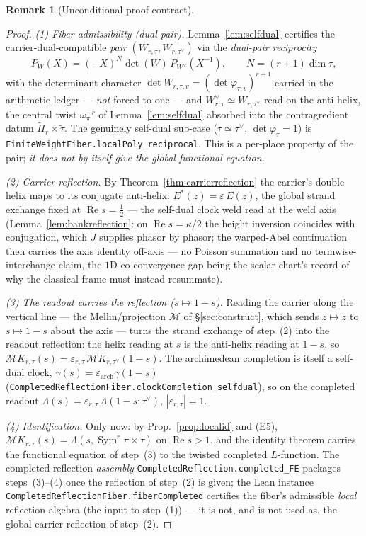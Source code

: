 \documentclass[11pt]{article}
\theoremstyle{definition}
\newtheorem{remark}[theorem]{Remark}
\renewcommand{\Re}{\operatorname{Re}}
\newcommand{\Sym}{\operatorname{Sym}}
\begin{document}
\begin{remark}[Unconditional proof contract]
\begin{enumerate}
\begin{proof}
\emph{(1) Fiber admissibility (dual pair).} Lemma~\ref{lem:selfdual} certifies the carrier-dual-compatible
\emph{pair} $(W_{r,\tau},W_{r,\tau^\vee})$ via the \emph{dual-pair reciprocity}
\[
  P_{W}(X)=(-X)^{N}\det(W)\,P_{W^\vee}(X^{-1}),\qquad N=(r+1)\dim\tau,
\]
with the determinant character $\det W_{r,\tau,v}=(\det\varphi_{\tau,v})^{r+1}$ carried in the arithmetic
ledger --- \emph{not} forced to one --- and $W_{r,\tau}^\vee\simeq W_{r,\tau^\vee}$ read on the anti-helix, the central twist $\omega_\pi^{-r}$ of Lemma~\ref{lem:selfdual} absorbed into the contragredient datum $\widetilde\Pi_r\times\widetilde\tau$.
The genuinely self-dual sub-case ($\tau\simeq\tau^\vee$, $\det\varphi_\tau=1$) is
\texttt{FiniteWeightFiber.localPoly\_reciprocal}. This is a per-place property of the pair; \emph{it does not by
itself give the global functional equation.}

\emph{(2) Carrier reflection.} By Theorem~\ref{thm:carrierreflection} the carrier's double helix maps to its
conjugate anti-helix: $E^{*}(\bar z)=\varepsilon\,E(z)$, the global strand exchange fixed at $\Re s=\tfrac12$
--- the self-dual clock weld read at the weld axis (Lemma~\ref{lem:bankreflection}: on $\Re s=\kappa/2$ the height inversion coincides with conjugation, which $J$ supplies phasor by phasor; the warped-Abel continuation then carries the axis identity off-axis --- no Poisson summation and no termwise-interchange claim, the $1$D co-convergence gap being the scalar chart's record of why the classical frame must instead resummate).

\emph{(3) The readout carries the reflection ($s\mapsto1-s$).} Reading the carrier along the vertical line
--- the Mellin/projection $\mathcal M$ of \S\ref{sec:construct}, which sends $z\mapsto\bar z$ to $s\mapsto1-s$
about the axis --- turns the strand exchange of step~(2) into the readout reflection: the helix reading at $s$
is the anti-helix reading at $1-s$, so $\mathcal M K_{r,\tau}(s)=\varepsilon_{r,\tau}\,\mathcal M
K_{r,\tau^\vee}(1-s)$. The archimedean completion is itself a self-dual clock,
$\gamma(s)=\varepsilon_{\mathrm{arch}}\gamma(1-s)$
(\texttt{CompletedReflectionFiber.clockCompletion\_selfdual}), so on the completed readout
$\Lambda(s)=\varepsilon_{r,\tau}\,\Lambda(1-s;\tau^\vee)$, $|\varepsilon_{r,\tau}|=1$.

\emph{(4) Identification.} Only now: by Prop.~\ref{prop:localid} and \textup{(E5)},
$\mathcal M K_{r,\tau}(s)=\Lambda(s,\Sym^r\pi\times\tau)$ on $\Re s>1$, and the identity theorem carries
the functional equation of step~(3) to the twisted completed $L$-function. The completed-reflection
\emph{assembly} \texttt{CompletedReflection.completed\_FE} packages steps~(3)--(4) once the reflection of
step~(2) is given; the Lean instance \texttt{CompletedReflectionFiber.fiberCompleted} certifies the fiber's
admissible \emph{local} reflection algebra (the input to step~(1)) --- it is not, and is not used as, the
global carrier reflection of step~(2).
\end{proof}


\end{enumerate}
\end{remark}
\end{document}

